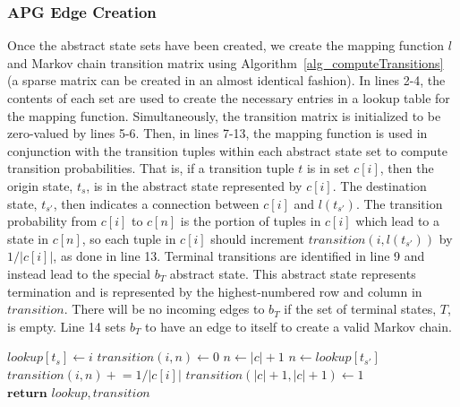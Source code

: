 \documentclass[letterpaper]{article} %
\newcommand{\pluseq}{\mathrel{+}=}
\begin{document}
\subsubsection{APG Edge Creation}
Once the abstract state sets have been created, we create the mapping function $l$ and Markov chain transition matrix using Algorithm~\ref{alg_computeTransitions} (a sparse matrix can be created in an almost identical fashion). In lines 2-4, the contents of each set are used to create the necessary entries in a lookup table for the mapping function. Simultaneously, the transition matrix is initialized to be zero-valued by lines 5-6. Then, in lines 7-13, the mapping function is used in conjunction with the transition tuples within each abstract state set to compute transition probabilities. That is, if a transition  tuple $t$ is in set $c[i]$, then the origin state, $t_s$, is in the abstract state represented by $c[i]$. The destination state, $t_{s'}$, then indicates a connection between $c[i]$ and $l(t_{s'})$. The transition probability from $c[i]$ to $c[n]$ is the portion of tuples in $c[i]$ which lead to a state in $c[n]$, so each tuple in $c[i]$ should increment $transition(i, l(t_{s'}))$ by $1 / |c[i]|$, as done in line 13. 
Terminal transitions are identified in line 9 and instead lead to the special $b_T$ abstract state. This abstract state represents termination and is represented by the highest-numbered row and column in $transition$. There will be no incoming edges to $b_T$ if the set of terminal states, $T$, is empty. Line 14 sets $b_T$ to have an edge to itself to create a valid Markov chain.

\begin{algorithm}[t] 
\caption{Create mapping function and transition matrix based on policy graph.} \label{alg_computeTransitions}
\begin{algorithmic}[1]
         \State $lookup[t_s] \leftarrow i$ 
      \EndFor
       
        \State $transition(i, n) \leftarrow 0$ 
      \EndFor
    \EndFor
         
          \State $n \leftarrow |c| + 1$
        \Else {}
          \State $n \leftarrow lookup[t_{s'}]$
        \EndIf
        \State $transition(i, n) \pluseq 1 / |c[i]|$
      \EndFor
    \EndFor
    \State $transition(|c|+1, |c|+1) \leftarrow 1$ 
    \State $\textbf{return } lookup, transition$
  \EndProcedure
\end{algorithmic}
\end{algorithm}
\end{document}
